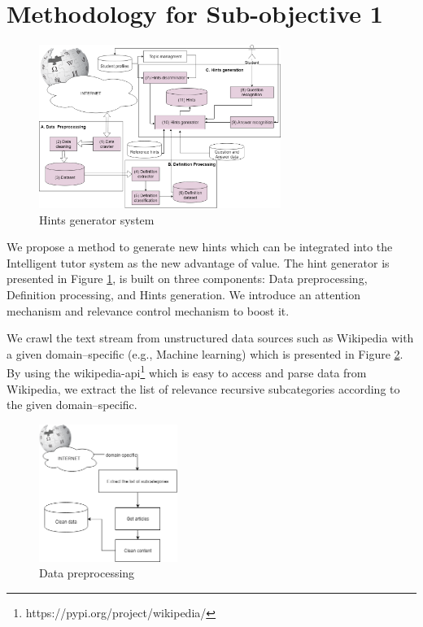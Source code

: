 \documentclass[letterpaper%
, twoside%
, 12pt%
,these%
, english%
,creativecommons,hyperref, withAlgo2e %
]{thETS}
\begin{document}
\section{Methodology for Sub-objective 1}
\begin{figure}
	\includegraphics[width=0.7\textwidth]{Figures/23.png}
	\caption{Hints generator system}
	\label{hintst}
\end{figure} 


We propose a method to generate new hints which can be integrated into the Intelligent tutor system as the new advantage of value. The hint generator is presented in Figure \ref{hintst}, is built on three components: Data preprocessing, Definition processing, and Hints generation. We introduce an attention mechanism and relevance control mechanism to boost it.  

We crawl the text stream from unstructured data sources such as Wikipedia with a given domain--specific (e.g.,  Machine learning) which is presented in Figure \ref{datapred}. By using the wikipedia-api\footnote{https://pypi.org/project/wikipedia/} which is easy to access and parse data from Wikipedia, we extract the  list of relevance recursive subcategories according to the given domain--specific. 

\begin{figure}[h]
	\includegraphics[width=0.4\textwidth]{Figures/cr.png}
	\caption{Data preprocessing}
	\label{datapred}
\end{figure} 
\end{document}
